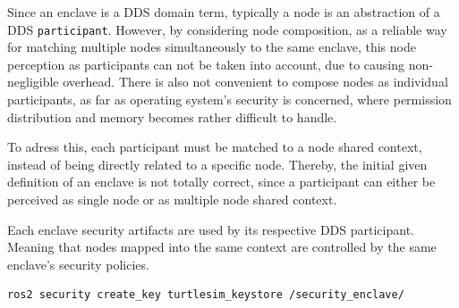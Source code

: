 Since an enclave is a DDS domain term, typically a node is an abstraction of a DDS \texttt{participant}. However, by considering node composition, as a reliable way for matching multiple nodes simultaneously to the same enclave, this node perception as participants can not be taken into account, due to causing non-negligible overhead. There is also not convenient to compose nodes as individual participants, as far as operating system's security is concerned, where permission distribution and memory becomes rather difficult to handle.

To adress this, each participant must be matched to a node shared context, instead of being directly related to a specific node. Thereby, the initial given definition of an enclave is not totally correct, since a participant can either be perceived as single node or as multiple node shared context. 
            
Each enclave security artifacts are used by its respective DDS participant. Meaning that nodes mapped into the same context are controlled by the same enclave's security policies. 


\begin{lstlisting}[title={Creation of an \texttt{enclave} into the predefined keystore.}]
ros2 security create_key turtlesim_keystore /security_enclave/
\end{lstlisting}
            

